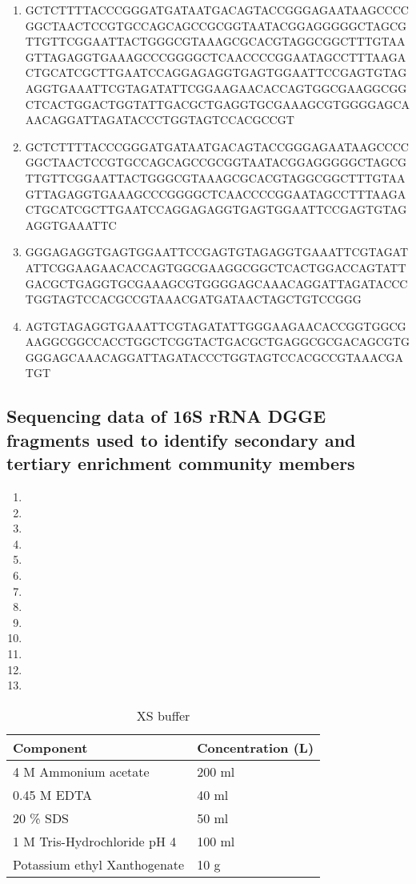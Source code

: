 \documentclass[11pt]{article}
\begin{document}
\begin{enumerate}
\item GCTCTTTTACCCGGGATGATAATGACAGTACCGGGAGAATAAGCCCCGGCTAACTCCGTGCCAGCAGCCGCGGTAATACGGAGGGGGCTAGCGTTGTTCGGAATTACTGGGCGTAAAGCGCACGTAGGCGGCTTTGTAAGTTAGAGGTGAAAGCCCGGGGCTCAACCCCGGAATAGCCTTTAAGACTGCATCGCTTGAATCCAGGAGAGGTGAGTGGAATTCCGAGTGTAGAGGTGAAATTCGTAGATATTCGGAAGAACACCAGTGGCGAAGGCGGCTCACTGGACTGGTATTGACGCTGAGGTGCGAAAGCGTGGGGAGCAAACAGGATTAGATACCCTGGTAGTCCACGCCGT
\item GCTCTTTTACCCGGGATGATAATGACAGTACCGGGAGAATAAGCCCCGGCTAACTCCGTGCCAGCAGCCGCGGTAATACGGAGGGGGCTAGCGTTGTTCGGAATTACTGGGCGTAAAGCGCACGTAGGCGGCTTTGTAAGTTAGAGGTGAAAGCCCGGGGCTCAACCCCGGAATAGCCTTTAAGACTGCATCGCTTGAATCCAGGAGAGGTGAGTGGAATTCCGAGTGTAGAGGTGAAATTC
\item GGGAGAGGTGAGTGGAATTCCGAGTGTAGAGGTGAAATTCGTAGATATTCGGAAGAACACCAGTGGCGAAGGCGGCTCACTGGACCAGTATTGACGCTGAGGTGCGAAAGCGTGGGGAGCAAACAGGATTAGATACCCTGGTAGTCCACGCCGTAAACGATGATAACTAGCTGTCCGGG 
\item AGTGTAGAGGTGAAATTCGTAGATATTGGGAAGAACACCGGTGGCGAAGGCGGCCACCTGGCTCGGTACTGACGCTGAGGCGCGACAGCGTGGGGAGCAAACAGGATTAGATACCCTGGTAGTCCACGCCGTAAACGATGT
\end{enumerate}

\subsection{Sequencing data of 16S rRNA DGGE fragments used to identify secondary and tertiary enrichment community members}
\begin{enumerate}
\item 
\item 
\item 
\item 
\item 
\item 
\item 
\item 
\item 
\item 
\item 
\item 
\item 
\end{enumerate}
\FloatBarrier

\begin{table}
\caption{XS buffer}
\begin{tabular}{  p{6.9cm} | p{6.9cm}  }
\hline
Component & Concentration (L) \\
\hline
 4 M Ammonium acetate & 200 ml  \\
  0.45 M EDTA  & 40 ml \\
    20 \% SDS  & 50 ml \\
    1 M Tris-Hydrochloride pH 4    & 100 ml  \\
        Potassium ethyl Xanthogenate  & 10 g  \\
  \hline
\end{tabular}
\end{table}
\FloatBarrier
\end{document}
